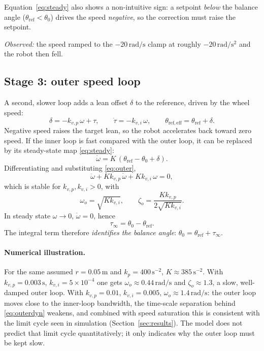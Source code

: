 \documentclass[11pt,a4paper]{article}
\newcommand{\rads}{\,\mathrm{rad/s}}
\newcommand{\radss}{\,\mathrm{rad/s^2}}
\begin{document}
Equation~\eqref{eq:steady} also shows a non-intuitive sign: a setpoint
\emph{below} the balance angle ($\theta_\mathrm{ref} < \theta_0$) drives the
speed \emph{negative}, so the correction must raise the setpoint.

\emph{Observed:} the speed ramped to the $-20\rads$ clamp at roughly
$-20\radss$ and the robot then fell.

\subsection{Stage 3: outer speed loop}
\label{sec:stage3}
A second, slower loop adds a lean offset $\delta$ to the reference, driven by
the wheel speed:
\begin{equation}
  \delta = -k_{v,p}\,\omega + \tau, \qquad \dot\tau = -k_{v,i}\,\omega,
  \qquad
  \theta_\mathrm{ref,eff} = \theta_\mathrm{ref} + \delta .
  \label{eq:outer}
\end{equation}
Negative speed raises the target lean, so the robot accelerates back toward
zero speed. If the inner loop is fast compared with the outer loop, it can be
replaced by its steady-state map \eqref{eq:steady}:
\begin{equation}
  \dot\omega = K\,(\theta_\mathrm{ref} - \theta_0 + \delta).
\end{equation}
Differentiating and substituting \eqref{eq:outer},
\begin{equation}
  \ddot\omega + K k_{v,p}\,\dot\omega + K k_{v,i}\,\omega = 0 ,
  \label{eq:outerdyn}
\end{equation}
which is stable for $k_{v,p},k_{v,i}>0$, with
\begin{equation}
  \omega_o = \sqrt{K k_{v,i}}, \qquad
  \zeta_o = \frac{K k_{v,p}}{2\sqrt{K k_{v,i}}} .
\end{equation}
In steady state $\omega \to 0$, $\dot\omega=0$, hence
\begin{equation}
  \tau_\infty = \theta_0 - \theta_\mathrm{ref} .
  \label{eq:trim}
\end{equation}
The integral term therefore \emph{identifies the balance angle}:
$\theta_0 = \theta_\mathrm{ref} + \tau_\infty$.

\paragraph{Numerical illustration.} For the same assumed $r = 0.05\,\mathrm{m}$
and $k_p = 400\,\mathrm{s^{-2}}$, $K \approx 385\,\mathrm{s^{-2}}$. With
$k_{v,p}=0.003\,\mathrm{s}$, $k_{v,i}=5\times10^{-4}$ one gets
$\omega_o \approx 0.44\rads$ and $\zeta_o \approx 1.3$, a slow, well-damped
outer loop. With $k_{v,p}=0.01$, $k_{v,i}=0.005$, $\omega_o \approx 1.4\rads$:
the outer loop moves close to the inner-loop bandwidth, the time-scale
separation behind \eqref{eq:outerdyn} weakens, and combined with speed
saturation this is consistent with the limit cycle seen in simulation
(Section~\ref{sec:results}). The model does not predict that limit cycle
quantitatively; it only indicates why the outer loop must be kept slow.
\end{document}
